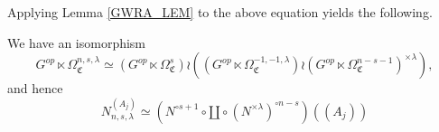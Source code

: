\documentclass[a4paper,10pt
,draft
]{article}%
\renewcommand{\1}{\eta}%
\newcommand{\SC}{\Sigma_{\mathfrak C}}
\newcommand{\OC}{\Omega_{\mathfrak C}}
\begin{document}
Applying Lemma \ref{GWRA_LEM} to the above equation yields the following.
\begin{proposition}
      \label{NNSL_PROP}
      We have an isomorphism
      \begin{equation}
            G^{op} \ltimes \OC^{n,s,\lambda} \simeq
            (G^{op} \ltimes \OC^{s}) \wr ((G^{op} \ltimes \OC^{-1,-1,\lambda}) \wr (G^{op} \ltimes \OC^{n-s-1})^{\times \lambda}),
      \end{equation}
      and hence
      \begin{equation}
            N_{n,s,\lambda}^{(A_j)}
            \simeq
            \left(
                  N^{\circ s + 1} \circ \amalg \circ (N^{\times \lambda})^{\circ n-s}
            \right)
            ((A_j))
      \end{equation}
\end{proposition}
\end{document}
